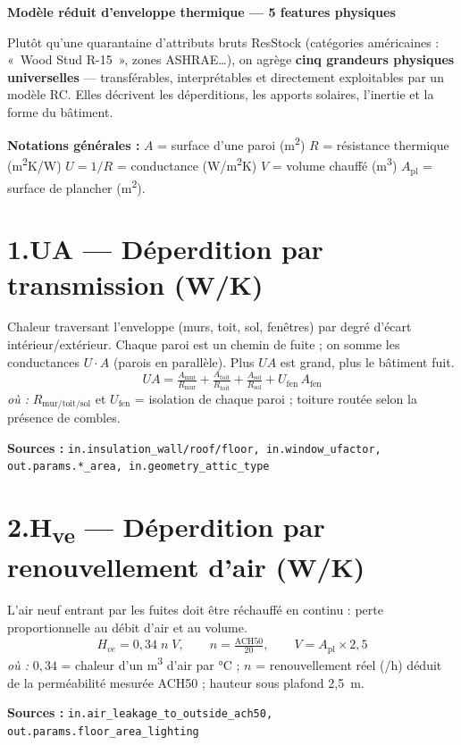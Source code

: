 \documentclass[10pt,a4paper]{article}
\newcommand{\feat}[2]{\section{\textcolor{#1}{#2}}}
\newcommand{\ou}[1]{{\small\textcolor{anthracite}{\textit{où :} #1}}\par}
\newcommand{\src}[1]{{\footnotesize\textcolor{anthracite}{\textbf{Sources :} \texttt{#1}}}\par}
\begin{document}
\begin{center}
{\LARGE\bfseries\textcolor{c1}{Modèle réduit d'enveloppe thermique} — \textcolor{c3}{5 features physiques}}
\end{center}

\vspace{-2pt}
{\small Plutôt qu'une quarantaine d'attributs bruts ResStock (catégories américaines : «~Wood Stud R-15~»,
zones ASHRAE\ldots), on agrège \textbf{cinq grandeurs physiques universelles} — transférables,
interprétables et directement exploitables par un modèle RC. Elles décrivent les déperditions, les
apports solaires, l'inertie et la forme du bâtiment.}

\vspace{2pt}
\noindent\colorbox{black!5}{\begin{minipage}{0.985\textwidth}
{\small\textbf{Notations générales :}
$A$ = surface d'une paroi (m\textsuperscript{2}) \;\textbullet\;
$R$ = résistance thermique (m\textsuperscript{2}K/W) \;\textbullet\;
$U = 1/R$ = conductance (W/m\textsuperscript{2}K) \;\textbullet\;
$V$ = volume chauffé (m\textsuperscript{3}) \;\textbullet\;
$A_{\text{pl}}$ = surface de plancher (m\textsuperscript{2}).}
\end{minipage}}

\feat{c1}{1.\quad UA — Déperdition par transmission (W/K)}
Chaleur traversant l'enveloppe (murs, toit, sol, fenêtres) par degré d'écart intérieur/extérieur.
Chaque paroi est un chemin de fuite ; on somme les conductances $U\!\cdot\!A$ (parois en parallèle).
Plus $UA$ est grand, plus le bâtiment fuit.
\[
UA = \tfrac{A_{\text{mur}}}{R_{\text{mur}}} + \tfrac{A_{\text{toit}}}{R_{\text{toit}}}
   + \tfrac{A_{\text{sol}}}{R_{\text{sol}}} + U_{\text{fen}}\,A_{\text{fen}}
\]
\ou{$R_{\text{mur/toit/sol}}$ et $U_{\text{fen}}$ = isolation de chaque paroi ; toiture routée selon la présence de combles.}
\src{in.insulation\_wall/roof/floor, in.window\_ufactor, out.params.*\_area, in.geometry\_attic\_type}

\feat{c2}{2.\quad H\textsubscript{ve} — Déperdition par renouvellement d'air (W/K)}
L'air neuf entrant par les fuites doit être réchauffé en continu : perte proportionnelle au débit
d'air et au volume.
\[
H_{ve} = 0{,}34 \; n \; V, \qquad n = \tfrac{\text{ACH50}}{20}, \qquad V = A_{\text{pl}} \times 2{,}5
\]
\ou{$0{,}34$ = chaleur d'un m\textsuperscript{3} d'air par °C ; $n$ = renouvellement réel (/h) déduit de la perméabilité mesurée ACH50 ; hauteur sous plafond 2,5~m.}
\src{in.air\_leakage\_to\_outside\_ach50, out.params.floor\_area\_lighting}
\end{document}
